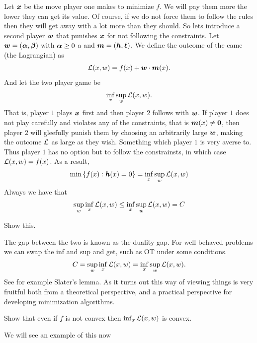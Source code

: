 \documentclass[
    a4paper,
    DIV=13,
    abstract=true,
    numbers=noenddot
]{scrartcl}
\begin{document}
Let ${\bm{x}}$ be the move player one makes to minimize $f$. We will pay them more the lower they can get its value. Of course, if we do not force them to follow the rules then they will get away with a lot more than they should. So lets introduce a second player ${\bm{w}}$ that punishes ${\bm{x}}$ for not following the constraints. Let ${\bm{w}}= ({\bm{\alpha}}, {\bm{\beta}})$ with ${\bm{\alpha}} \ge 0$ a and ${\bm{m}}=({\bm{h}}, {\bm{\ell }})$. We define the outcome of the came (the Lagrangian) as
\begin{align*}
    \mathcal{L}(x,w)= f(x)+ {\bm{w}} \cdot {\bm{m}}(x).
\end{align*}
And let the two player game be 
\begin{align*}
      \inf_x\sup_w\mathcal{L}(x,w).
\end{align*}
That is, player $1$ plays ${\bm{x}}$ first and then player $2$ follows with ${\bm{w}}$. If player $1$ does not play carefully and violates any of the constraints, that is ${\bm{m}}(x) \neq {\bm{0}}$, then player $2$ will gleefully punish them by choosing an arbitrarily large ${\bm{w}}$, making the outcome $\mathcal{L}$ as large as they wish. Something which player $1$ is very averse to. Thus player $1$ has no option but to follow the constrainsts, in which case $\mathcal{L}(x,w)= f(x)$. As a result,
\begin{align*}
  \min_{} \left\{f(x): {\bm{h}}(x)=0\right\}= \inf_x\sup_w \mathcal{L}(x,w)
\end{align*}
Always we have that
\begin{align*}
    \sup_w \inf_x\mathcal{L}(x,w) \le \inf_x\sup_w \mathcal{L}(x,w)=C
  \end{align*}
\begin{exercise}
    Show this.
    \exerciseSymbol
\end{exercise}
The gap between the two is known as the duality gap. For well behaved problems we can swap the inf and sup and get, such as OT under some conditions.
\begin{align*}
  C= \sup_w \inf_x\mathcal{L}(x,w)=\inf_x\sup_w \mathcal{L}(x,w).
\end{align*}
See for example Slater's lemma. As it turns out this way of viewing things is very fruitful both from a theoretical perspective, and a practical perspective for developing minimization algorithms. 
\begin{exercise}
    Show that even if $f$ is not convex then $\inf_x \mathcal{L}(x,w)$ is convex.
    \exerciseSymbol
\end{exercise}
We will see an example of this now
\end{document}
